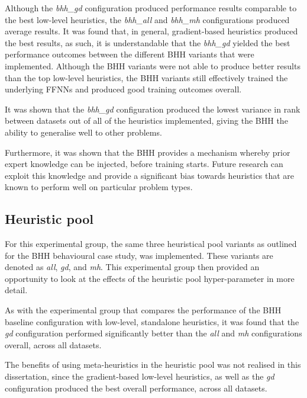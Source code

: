 Although the \textit{bhh\_gd} configuration produced performance results comparable to the best low-level heuristics, the \textit{bhh\_all} and \textit{bhh\_mh} configurations produced average results. It was found that, in general, gradient-based heuristics produced the best results, as such, it is understandable that the \textit{bhh\_gd}  yielded the best performance outcomes between the different \acs{BHH} variants that were implemented. Although the \acs{BHH} variants were not able to produce better results than the top low-level heuristics, the \acs{BHH} variants still effectively trained the underlying \acp{FFNN} and produced good training outcomes overall.

It was shown that the \textit{bhh\_gd} configuration produced the lowest variance in rank between datasets out of all of the heuristics implemented, giving the \acs{BHH} the ability to generalise well to other problems.

Furthermore, it was shown that the \acs{BHH} provides a mechanism whereby prior expert knowledge can be injected, before training starts. Future research can exploit this knowledge and provide a significant bias towards heuristics that are known to perform well on particular problem types.

\subsection{Heuristic pool}
\label{sec:conclusion:results:summary:heuristic_pool}

For this experimental group, the same three heuristical pool variants as outlined for the \acs{BHH} behavioural case study, was implemented. These variants are denoted as \textit{all}, \textit{gd}, and \textit{mh}. This experimental group then provided an opportunity to look at the effects of the heuristic pool hyper-parameter in more detail.

As with the experimental group that compares the performance of the \acs{BHH} baseline configuration with low-level, standalone heuristics, it was found that the \textit{gd} configuration performed significantly better than the \textit{all} and \textit{mh} configurations overall, across all datasets.

The benefits of using meta-heuristics in the heuristic pool was not realised in this dissertation, since the gradient-based low-level heuristics, as well as the \textit{gd} configuration produced the best overall performance, across all datasets.

